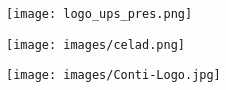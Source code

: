 \documentclass[a4paper, 12pt]{report}
\begin{document}
            \begin{figure}[H]
             \centering
             \begin{subfigure}[t]{1\textwidth}
                 \centering
                 \texttt{[image: logo\_ups\_pres.png]} 
             \end{subfigure}
             \hfill
             \begin{subfigure}[t]{0.49\textwidth}
             \centering
            \texttt{[image: images/celad.png]}

             \end{subfigure}
             \hfill 
            \begin{subfigure}[t]{0.49\textwidth}
                 \centering
              \texttt{[image: images/Conti-Logo.jpg]}

             \end{subfigure}
             \hfill
            \end{figure}

 
\end{document}
